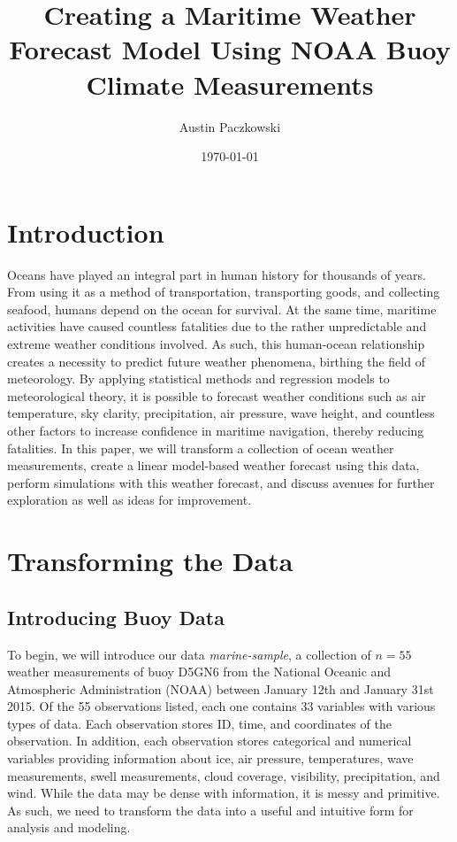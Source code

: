 \documentclass{article}
\title{Creating a Maritime Weather Forecast Model Using NOAA Buoy Climate Measurements}
\author{Austin Paczkowski}
\date{\today}
\begin{document}
\maketitle

\section{Introduction}

Oceans have played an integral part in human history for thousands of years. From using it as a method of transportation, transporting goods, and collecting seafood, humans depend on the ocean for survival. At the same time, maritime activities have caused countless fatalities due to the rather unpredictable and extreme weather conditions involved. As such, this human-ocean relationship creates a necessity to predict future weather phenomena, birthing the field of meteorology. By applying statistical methods and regression models to meteorological theory, it is possible to forecast weather conditions such as air temperature, sky clarity, precipitation, air pressure, wave height, and countless other factors to increase confidence in maritime navigation, thereby reducing fatalities. In this paper, we will transform a collection of ocean weather measurements, create a linear model-based weather forecast using this data, perform simulations with this weather forecast, and discuss avenues for further exploration as well as ideas for improvement.

\section{Transforming the Data}

\subsection{Introducing Buoy Data}

To begin, we will introduce our data \textit{marine-sample}, a collection of $n = 55$  weather measurements of buoy D5GN6 from the National Oceanic and Atmospheric Administration (NOAA) between January 12th and January 31st 2015\cite{noaaDatasetsClimate}. Of the 55 observations listed, each one contains 33 variables with various types of data. Each observation stores ID, time, and coordinates of the observation. In addition, each observation stores categorical and numerical variables providing information about ice, air pressure, temperatures, wave measurements, swell measurements, cloud coverage, visibility, precipitation, and wind. While the data may be dense with information, it is messy and primitive. As such, we need to transform the data into a useful and intuitive form for analysis and modeling.
\end{document}
